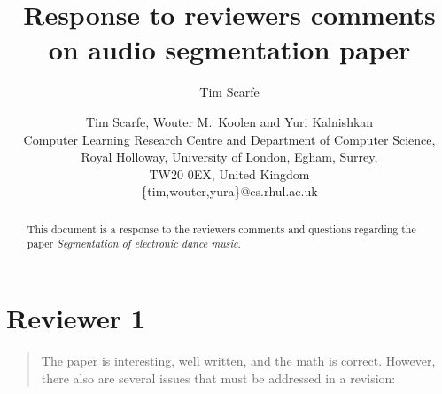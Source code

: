 \documentclass[12pt,a4paper,twoside,final,onecolumn]{article}
\author{Tim Scarfe}
\title{Response to reviewers comments on audio segmentation paper}
\author{Tim Scarfe, Wouter M.~Koolen and Yuri Kalnishkan \\ 
	Computer Learning Research
	Centre and Department of Computer Science, \\ 
	Royal Holloway,  University of London, Egham, Surrey,\\ TW20 0EX, United Kingdom\\
	\{tim,wouter,yura\}@cs.rhul.ac.uk
}
\begin{document}
		\maketitle
		\begin{abstract}This document is a response to the reviewers comments and questions regarding the paper \textit{Segmentation of electronic dance music}.
			\end{abstract}
	
\section{Reviewer 1}
	
\begin{quote} 
	The paper is interesting, well written, and the math is correct. However, there also are several issues that must be addressed in a revision:
\end{quote}
\end{document}
